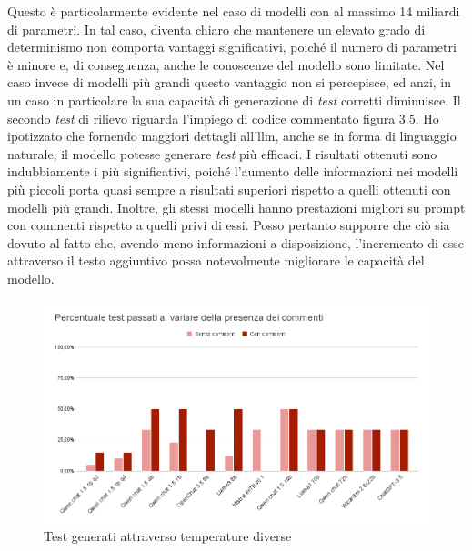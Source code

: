     Questo è particolarmente evidente nel caso di modelli con al massimo 14 miliardi di parametri. 
    In tal caso, diventa chiaro che mantenere un elevato grado di determinismo non comporta vantaggi significativi, 
    poiché il numero di parametri è minore e, di conseguenza, anche le conoscenze del modello sono limitate. Nel caso invece 
    di modelli più grandi questo vantaggio non si percepisce, ed anzi, in un caso in particolare la sua capacità di generazione di \textit{test} corretti diminuisce.
    Il secondo \textit{test} di rilievo riguarda l'impiego di codice commentato figura 3.5. Ho ipotizzato che fornendo maggiori dettagli all'\gls{llm}, 
    anche se in forma di linguaggio naturale, il modello potesse generare \textit{test} più efficaci. I risultati ottenuti sono indubbiamente 
    i più significativi, poiché l'aumento delle informazioni nei modelli più piccoli porta quasi sempre a risultati superiori rispetto 
    a quelli ottenuti con modelli più grandi. Inoltre, gli stessi modelli hanno prestazioni migliori su prompt con commenti rispetto a
     quelli privi di essi. Posso pertanto supporre che ciò sia dovuto al fatto che, avendo meno informazioni a disposizione, l'incremento di esse 
     attraverso il testo aggiuntivo possa notevolmente migliorare le capacità del modello.
    \begin{figure}[!h]
        \centering        
        \includegraphics[width=14.5cm]{img/Percentuale test passati al variare della presenza dei commenti.png}
        \caption{Test generati attraverso temperature diverse}
    \end{figure}

